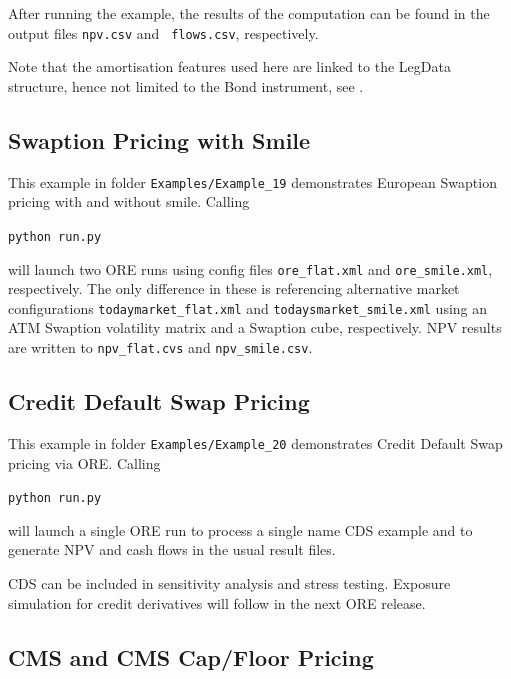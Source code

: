 After running the example, the results of the computation can be found in the output files {\tt npv.csv} and {\tt
  flows.csv}, respectively.

\medskip
Note that the amortisation features used here are linked to the LegData structure, hence not limited to the Bond instrument, see \cite{products}. %

\subsection{Swaption Pricing with Smile}%

This example in folder {\tt Examples/Example\_19} demonstrates European Swaption pricing with and without smile. Calling

\medskip
\centerline{\tt python run.py}

\medskip
will launch two ORE runs using config files {\tt ore\_flat.xml} and {\tt ore\_smile.xml}, respectively. The only difference in these is referencing alternative market configurations {\tt todaymarket\_flat.xml} and {\tt todaysmarket\_smile.xml} using an ATM Swaption volatility matrix and a Swaption cube, respectively. NPV results are written to {\tt npv\_flat.cvs} and {\tt npv\_smile.csv}.

\subsection{Credit Default Swap Pricing}%

This example in folder {\tt Examples/Example\_20} demonstrates Credit Default Swap pricing via ORE. Calling

\medskip
\centerline{\tt python run.py}

\medskip
will launch a single ORE run to process a single name CDS example and to generate NPV and cash flows in the usual result files.

\medskip
CDS can be included in sensitivity analysis and stress testing. Exposure simulation for credit derivatives will follow in the next ORE release.

\subsection{CMS and CMS Cap/Floor Pricing}%

